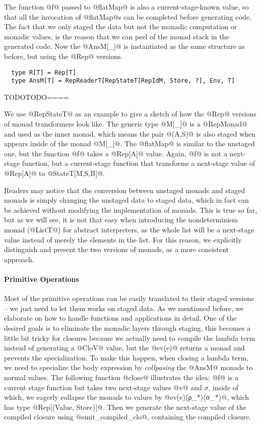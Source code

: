 The function @f@ passed to @flatMap@ is also a current-stage-known value, so
that all the invocation of @flatMap@s can be completed before generating code.
The fact that we only staged the data but not the monadic computation or monadic
values, is the reason that we can peel of the monad stack in the generated code.
Now the @AnsM[_]@ is instantiated as the same structure as before, but using the
@Rep@ versions.

\begin{lstlisting}
  type R[T] = Rep[T]
  type AnsM[T] = RepReaderT[RepStateT[RepIdM, Store, ?], Env, T]
\end{lstlisting}

TODOTODO====

We use @RepStateT@ as an example to give a sketch of how the @Rep@ versions of monad
transformers look like. The generic type @M[_]@ is a @RepMonad@ and used as the
inner monad, which means the pair @(A,S)@ is also staged when appears inside of the monad
@M[_]@. The @flatMap@ is similar to the unstaged one, but the function @f@ takes
a @Rep[A]@ value. Again, @f@ is not a next-stage function, but a current-stage
function that transforms a next-stage value of @Rep[A]@ to @StateT[M,S,B]@.


Readers may notice that the conversion between unstaged monads and staged monads
is simply changing the unstaged data to staged data, which in fact can be
achieved without modifying the implementation of monads. This is true so far, but
as we will see, it is not that easy when introducing the nondeterminism monad
(@ListT@) for abstract interpreters, as the whole list will be a next-stage
value instead of merely the elements in the list. For this reason, we explicitly
distinguish and present the two versions of monads, as a more consistent
approach.

\paragraph{Primitive Operations} Most of the primitive operations can be easily
translated to their staged versions -- we just need to let them works on staged data.
As we mentioned before, we elaborate on how to handle functions and applications in
detail. One of the desired goals is to eliminate the monadic layers through
staging, this becomes a little bit tricky for closures because we actually need 
 to compile the lambda term instead of generating a @CloV@ value, but the @ev(e)@
returns a monad and prevents the specialization. To make this happen, when
closing a lambda term, we need to specialize the body expression by
\textit{collpasing} the @AnsM@ monads to normal values. The
following function @close@ illustrates the idea: @f@ is a current stage function
but takes two next-stage values @v@ and $\sigma$, inside of which, we eagerly
collapse the monads to values by @ev(e)(ρ_*)(σ_*)@, which has type
@Rep[(Value, Store)]@. Then we generate the next-stage value of the compiled
closure using @emit_compiled_clo@, containing the compiled closure.

